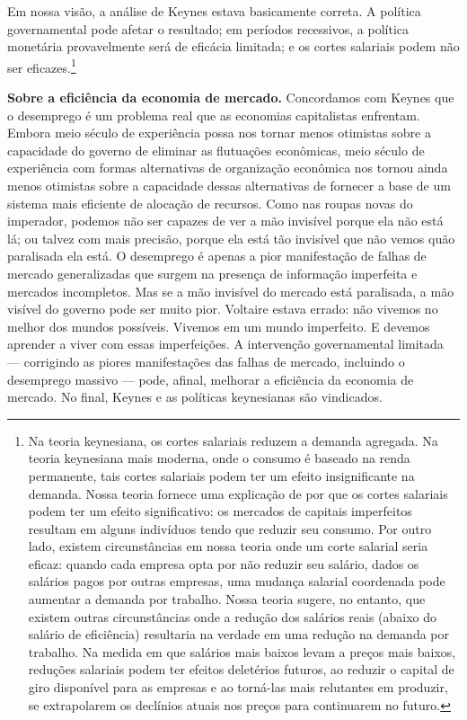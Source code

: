 \documentclass[12pt]{article}
\begin{document}
Em nossa visão, a análise de Keynes estava basicamente correta. A política governamental pode afetar o resultado; em períodos recessivos, a política monetária provavelmente será de eficácia limitada; e os cortes salariais podem não ser eficazes.\footnote{Na teoria keynesiana, os cortes salariais reduzem a demanda agregada. Na teoria keynesiana mais moderna, onde o consumo é baseado na renda permanente, tais cortes salariais podem ter um efeito insignificante na demanda. Nossa teoria fornece uma explicação de por que os cortes salariais podem ter um efeito significativo: os mercados de capitais imperfeitos resultam em alguns indivíduos tendo que reduzir seu consumo. Por outro lado, existem circunstâncias em nossa teoria onde um corte salarial seria eficaz: quando cada empresa opta por não reduzir seu salário, dados os salários pagos por outras empresas, uma mudança salarial coordenada pode aumentar a demanda por trabalho. Nossa teoria sugere, no entanto, que existem outras circunstâncias onde a redução dos salários reais (abaixo do salário de eficiência) resultaria na verdade em uma redução na demanda por trabalho. Na medida em que salários mais baixos levam a preços mais baixos, reduções salariais podem ter efeitos deletérios futuros, ao reduzir o capital de giro disponível para as empresas e ao torná-las mais relutantes em produzir, se extrapolarem os declínios atuais nos preços para continuarem no futuro.}

\textbf{Sobre a eficiência da economia de mercado.} Concordamos com Keynes que o desemprego é um problema real que as economias capitalistas enfrentam. Embora meio século de experiência possa nos tornar menos otimistas sobre a capacidade do governo de eliminar as flutuações econômicas, meio século de experiência com formas alternativas de organização econômica nos tornou ainda menos otimistas sobre a capacidade dessas alternativas de fornecer a base de um sistema mais eficiente de alocação de recursos. Como nas roupas novas do imperador, podemos não ser capazes de ver a mão invisível porque ela não está lá; ou talvez com mais precisão, porque ela está tão invisível que não vemos quão paralisada ela está. O desemprego é apenas a pior manifestação de falhas de mercado generalizadas que surgem na presença de informação imperfeita e mercados incompletos. Mas se a mão invisível do mercado está paralisada, a mão visível do governo pode ser muito pior. Voltaire estava errado: não vivemos no melhor dos mundos possíveis. Vivemos em um mundo imperfeito. E devemos aprender a viver com essas imperfeições. A intervenção governamental limitada — corrigindo as piores manifestações das falhas de mercado, incluindo o desemprego massivo — pode, afinal, melhorar a eficiência da economia de mercado. No final, Keynes e as políticas keynesianas são vindicados.
\end{document}
